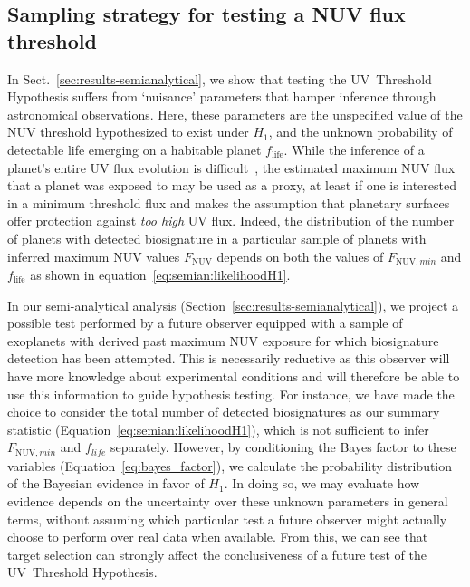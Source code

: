 \documentclass[twocolumn,twocolappendix,linenumbers]{aastex631}
\begin{document}
\subsection{Sampling strategy for testing a \gls{NUV} flux threshold} %
In Sect.~\ref{sec:results-semianalytical}, we show that testing the UV~Threshold Hypothesis suffers from `nuisance' parameters that hamper inference through astronomical observations.
Here, these parameters are the unspecified value of the \gls{NUV} threshold hypothesized to exist under $H_1$, and the unknown probability of detectable life emerging on a habitable planet $f_{\mathrm{life}}$.
While the inference of a planet's entire UV flux evolution is difficult~\citep[e.g.,][]{Richey-Yowell2023}, the estimated maximum \gls{NUV} flux that a planet was exposed to may be used as a proxy, at least if one is interested in a minimum threshold flux and makes the assumption that planetary surfaces offer protection against \textit{too high} UV flux.
Indeed, the distribution of the number of planets with detected biosignature in a particular sample of planets with inferred maximum \gls{NUV} values $F_{\mathrm{NUV}}$ depends on both the values of $F_{\mathrm{NUV},min}$ and $f_{\mathrm{life}}$ as shown in equation~\ref{eq:semian:likelihoodH1}.

In our semi-analytical analysis (Section~\ref{sec:results-semianalytical}), we project a possible test performed by a future observer equipped with a sample of exoplanets with derived past maximum \gls{NUV} exposure for which biosignature detection has been attempted.
This is necessarily reductive as this observer will have more knowledge about experimental conditions and will therefore be able to use this information to guide hypothesis testing.
For instance, we have made the choice to consider the total number of detected biosignatures as our summary statistic (Equation~\ref{eq:semian:likelihoodH1}), which is not sufficient to infer $F_{\mathrm{NUV},min}$ and $f_{life}$ separately.
However, by conditioning the Bayes factor to these variables (Equation~\ref{eq:bayes_factor}), we calculate the probability distribution of the Bayesian evidence in favor of $H_1$.
In doing so, we may evaluate how evidence depends on the uncertainty over these unknown parameters in general terms, without assuming which particular test a future observer might actually choose to perform over real data when available.
From this, we can see that target selection can strongly affect the conclusiveness of a future test of the UV~Threshold Hypothesis.
\end{document}
